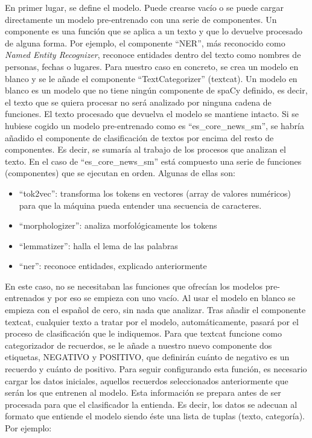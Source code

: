 En primer lugar, se define el modelo. Puede crearse vacío o se puede cargar directamente un modelo pre-entrenado con una serie de componentes. Un componente es una función que se aplica a un texto y que lo devuelve procesado de alguna forma. Por ejemplo, el componente ``NER'', más reconocido como \textit{Named Entity Recognizer}, reconoce entidades dentro del texto como nombres de personas, fechas o lugares. Para nuestro caso en concreto, se crea un modelo en blanco y se le añade el componente ``TextCategorizer'' (textcat). Un modelo en blanco es un modelo que no tiene ningún componente de spaCy definido, es decir, el texto que se quiera procesar no será analizado por ninguna cadena de funciones. El texto procesado que devuelva el modelo se mantiene intacto. Si se hubiese cogido un modelo pre-entrenado como es ``es\_core\_news\_sm'', se habría añadido el componente de clasificación de textos por encima del resto de componentes. Es decir, se sumaría al trabajo de los procesos que analizan el texto. En el caso de ``es\_core\_news\_sm'' está compuesto una serie de funciones (componentes) que se ejecutan en orden. Algunas de ellas son:

\begin{itemize}
	\item ``tok2vec'': transforma los tokens en vectores (array de valores numéricos) para que la máquina pueda entender una secuencia de caracteres.
	\item ``morphologizer'': analiza morfológicamente los tokens
	\item ``lemmatizer'': halla el lema de las palabras
	\item ``ner'': reconoce entidades, explicado anteriormente
\end{itemize}

En este caso, no se necesitaban las funciones que ofrecían los modelos pre-entrenados y por eso se empieza con uno vacío. Al usar el modelo en blanco se empieza con el español de cero, sin nada que analizar. Tras añadir el componente textcat, cualquier texto a tratar por el modelo, automáticamente, pasará por el proceso de clasificación que le indiquemos. Para que textcat funcione como categorizador de recuerdos, se le añade a nuestro nuevo componente dos etiquetas, NEGATIVO y POSITIVO, que definirán cuánto de negativo es un recuerdo y cuánto de positivo. Para seguir configurando esta función, es necesario cargar los datos iniciales, aquellos recuerdos seleccionados anteriormente que serán los que entrenen al modelo. Esta información se prepara antes de ser procesada para que el clasificador la entienda. Es decir, los datos se adecuan al formato que entiende el modelo siendo éste una lista de tuplas (texto, categoría). Por ejemplo: \\

